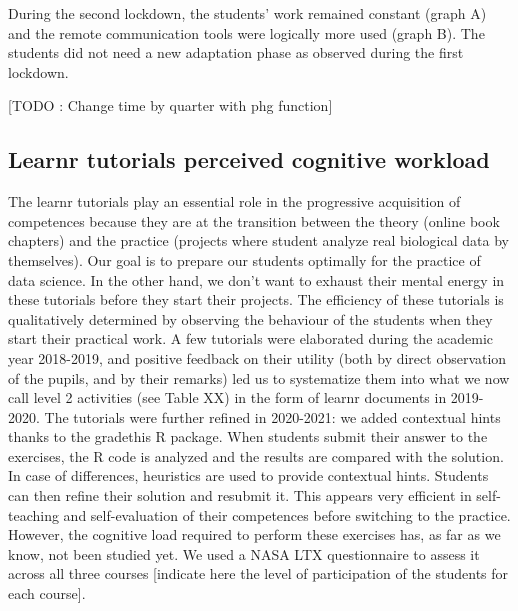 \documentclass[
]{article}
\begin{document}
During the second lockdown, the students' work remained constant (graph
A) and the remote communication tools were logically more used (graph
B). The students did not need a new adaptation phase as observed during
the first lockdown.

{[}TODO : Change time by quarter with phg function{]}

\hypertarget{learnr-tutorials-perceived-cognitive-workload}{%
\subsection{Learnr tutorials perceived cognitive
workload}\label{learnr-tutorials-perceived-cognitive-workload}}

The learnr tutorials play an essential role in the progressive
acquisition of competences because they are at the transition between
the theory (online book chapters) and the practice (projects where
student analyze real biological data by themselves). Our goal is to
prepare our students optimally for the practice of data science. In the
other hand, we don't want to exhaust their mental energy in these
tutorials before they start their projects. The efficiency of these
tutorials is qualitatively determined by observing the behaviour of the
students when they start their practical work. A few tutorials were
elaborated during the academic year 2018-2019, and positive feedback on
their utility (both by direct observation of the pupils, and by their
remarks) led us to systematize them into what we now call level 2
activities (see Table XX) in the form of learnr documents in 2019-2020.
The tutorials were further refined in 2020-2021: we added contextual
hints thanks to the gradethis R package. When students submit their
answer to the exercises, the R code is analyzed and the results are
compared with the solution. In case of differences, heuristics are used
to provide contextual hints. Students can then refine their solution and
resubmit it. This appears very efficient in self-teaching and
self-evaluation of their competences before switching to the practice.
However, the cognitive load required to perform these exercises has, as
far as we know, not been studied yet. We used a NASA LTX questionnaire
to assess it across all three courses {[}indicate here the level of
participation of the students for each course{]}.
\end{document}
